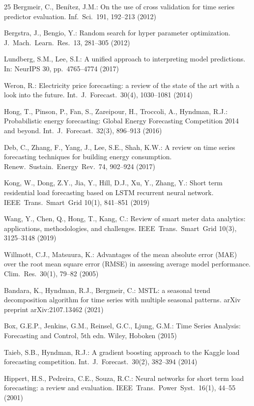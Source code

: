\documentclass[runningheads]{llncs}
\begin{document}
\begin{thebibliography}{25}
Bergmeir, C., Ben{\'i}tez, J.M.: On the use of cross validation for time series predictor evaluation. Inf.\ Sci.\ 191, 192--213 (2012)

Bergstra, J., Bengio, Y.: Random search for hyper parameter optimization. J.\ Mach.\ Learn.\ Res.\ 13, 281--305 (2012)

Lundberg, S.M., Lee, S.I.: A unified approach to interpreting model predictions. In: NeurIPS 30, pp.\ 4765--4774 (2017)

Weron, R.: Electricity price forecasting: a review of the state of the art with a look into the future. Int.\ J.\ Forecast.\ 30(4), 1030--1081 (2014)

Hong, T., Pinson, P., Fan, S., Zareipour, H., Troccoli, A., Hyndman, R.J.: Probabilistic energy forecasting: Global Energy Forecasting Competition 2014 and beyond. Int.\ J.\ Forecast.\ 32(3), 896--913 (2016)

Deb, C., Zhang, F., Yang, J., Lee, S.E., Shah, K.W.: A review on time series forecasting techniques for building energy consumption. Renew.\ Sustain.\ Energy\ Rev.\ 74, 902--924 (2017)

Kong, W., Dong, Z.Y., Jia, Y., Hill, D.J., Xu, Y., Zhang, Y.: Short term residential load forecasting based on {LSTM} recurrent neural network. IEEE\ Trans.\ Smart\ Grid 10(1), 841--851 (2019)

Wang, Y., Chen, Q., Hong, T., Kang, C.: Review of smart meter data analytics: applications, methodologies, and challenges. IEEE\ Trans.\ Smart\ Grid 10(3), 3125--3148 (2019)

Willmott, C.J., Matsuura, K.: Advantages of the mean absolute error ({MAE}) over the root mean square error ({RMSE}) in assessing average model performance. Clim.\ Res.\ 30(1), 79--82 (2005)

Bandara, K., Hyndman, R.J., Bergmeir, C.: {MSTL}: a seasonal trend decomposition algorithm for time series with multiple seasonal patterns. arXiv preprint arXiv:2107.13462 (2021)

Box, G.E.P., Jenkins, G.M., Reinsel, G.C., Ljung, G.M.: Time Series Analysis: Forecasting and Control, 5th edn. Wiley, Hoboken (2015)

Taieb, S.B., Hyndman, R.J.: A gradient boosting approach to the {K}aggle load forecasting competition. Int.\ J.\ Forecast.\ 30(2), 382--394 (2014)

Hippert, H.S., Pedreira, C.E., Souza, R.C.: Neural networks for short term load forecasting: a review and evaluation. IEEE\ Trans.\ Power\ Syst.\ 16(1), 44--55 (2001)

\end{thebibliography}
\end{document}
